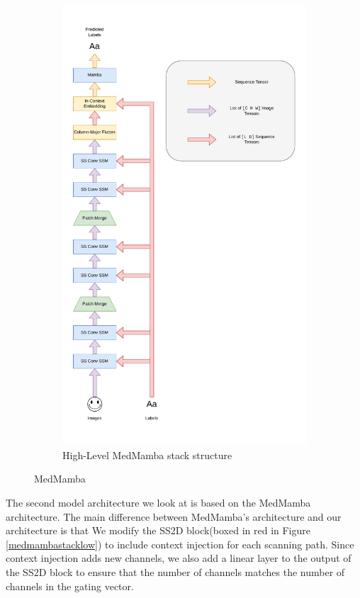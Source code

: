 \begin{figure}[ht]
\begin{subfigure}{0.5\textwidth}
        \includegraphics[width=\textwidth]{figures/medmamba_stack.pdf}
        \caption{High-Level MedMamba stack structure}
        \label{medmambastackhigh}
    \end{subfigure}
    \caption{MedMamba}
    \label{medmambastack}
\end{figure}
The second model architecture we look at is based on the MedMamba
architecture\cite{medmamba}.
The main difference between MedMamba's architecture and our architecture is that
We modify the SS2D block(boxed in red in Figure \ref{medmambastacklow}) to
include context injection for each scanning path.
Since context injection adds new channels, we also add a linear layer to the
output of the SS2D block to ensure that the number of channels matches the
number of channels in the gating vector.

